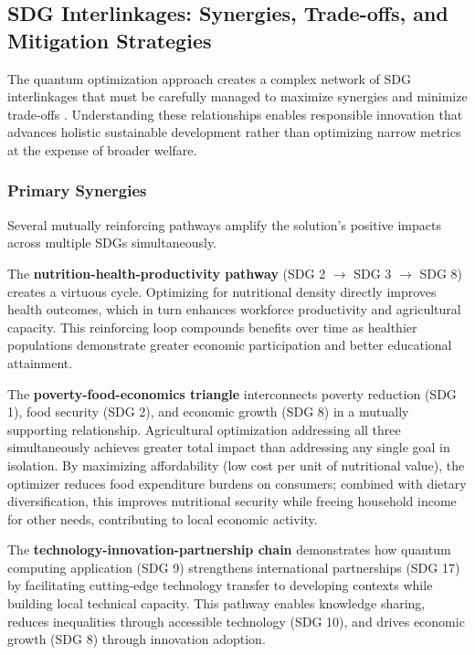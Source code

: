 \documentclass{oqireport}
\begin{document}
\subsection{SDG Interlinkages: Synergies, Trade-offs, and Mitigation Strategies}

The quantum optimization approach creates a complex network of SDG interlinkages that must be carefully managed to maximize synergies and minimize trade-offs \cite{Fanzo2022,UNFSS_Planet_2023,Sylvester2024}. Understanding these relationships enables responsible innovation that advances holistic sustainable development rather than optimizing narrow metrics at the expense of broader welfare.

\subsubsection{Primary Synergies}

Several mutually reinforcing pathways amplify the solution's positive impacts across multiple SDGs simultaneously.

The \textbf{nutrition-health-productivity pathway} (SDG 2 $\rightarrow$ SDG 3 $\rightarrow$ SDG 8) creates a virtuous cycle. Optimizing for nutritional density directly improves health outcomes, which in turn enhances workforce productivity and agricultural capacity. This reinforcing loop compounds benefits over time as healthier populations demonstrate greater economic participation and better educational attainment.

The \textbf{poverty-food-economics triangle} interconnects poverty reduction (SDG 1), food security (SDG 2), and economic growth (SDG 8) in a mutually supporting relationship. Agricultural optimization addressing all three simultaneously achieves greater total impact than addressing any single goal in isolation. By maximizing affordability (low cost per unit of nutritional value), the optimizer reduces food expenditure burdens on consumers; combined with dietary diversification, this improves nutritional security while freeing household income for other needs, contributing to local economic activity.

The \textbf{technology-innovation-partnership chain} demonstrates how quantum computing application (SDG 9) strengthens international partnerships (SDG 17) by facilitating cutting-edge technology transfer to developing contexts while building local technical capacity. This pathway enables knowledge sharing, reduces inequalities through accessible technology (SDG 10), and drives economic growth (SDG 8) through innovation adoption.
\end{document}
